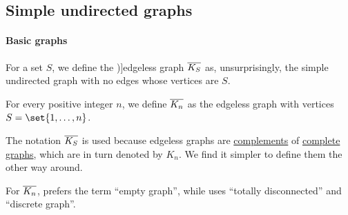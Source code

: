 \subsection{Simple undirected graphs}\label{subsec:simple_undirected_graphs}

\paragraph{Basic graphs}

\begin{definition}\label{def:edgeless_graph}\mimprovised
  For a set \( S \), we define the \term[ru=безрёберный (\cite[16]{Зыков2004})]{edgeless graph} \( \oline{K_S} \) as, unsurprisingly, the simple undirected graph with no edges whose vertices are \( S \).

  For every positive integer \( n \), we define \( \oline{K_n} \) as the edgeless graph with vertices \( S = \set{ 1, \ldots, n } \).
\end{definition}
\begin{comments}
  \item The notation \( \oline{K_S} \) is used because edgeless graphs are \hyperref[def:graph_complement]{complements} of \hyperref[def:complete_graph]{complete graphs}, which are in turn denoted by \( K_n \). We find it simpler to define them the other way around.

  \item For \( \oline{K_n} \),  prefers the term \enquote{empty graph}, while  uses \enquote{totally disconnected} and \enquote{discrete graph}.
\end{comments}

